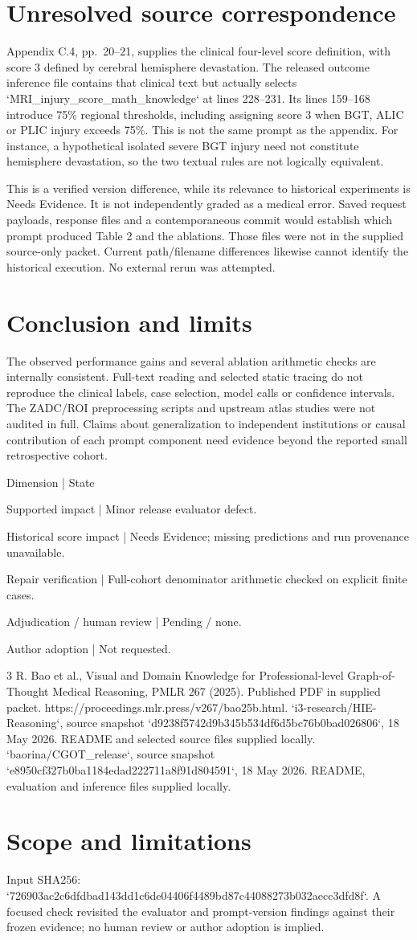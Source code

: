 \documentclass[10pt]{article}
\begin{document}
\section*{Unresolved source correspondence}
Appendix C.4, pp. 20–21, supplies the clinical four-level score definition, with score 3 defined by cerebral hemisphere devastation. The released outcome inference file contains that clinical text but actually selects `MRI\_injury\_score\_math\_knowledge` at lines 228–231. Its lines 159–168 introduce 75\% regional thresholds, including assigning score 3 when BGT, ALIC or PLIC injury exceeds 75\%. This is not the same prompt as the appendix. For instance, a hypothetical isolated severe BGT injury need not constitute hemisphere devastation, so the two textual rules are not logically equivalent.\par
This is a verified version difference, while its relevance to historical experiments is Needs Evidence. It is not independently graded as a medical error. Saved request payloads, response files and a contemporaneous commit would establish which prompt produced Table 2 and the ablations. Those files were not in the supplied source-only packet. Current path/filename differences likewise cannot identify the historical execution. No external rerun was attempted.\par
\section*{Conclusion and limits}
The observed performance gains and several ablation arithmetic checks are internally consistent. Full-text reading and selected static tracing do not reproduce the clinical labels, case selection, model calls or confidence intervals. The ZADC/ROI preprocessing scripts and upstream atlas studies were not audited in full. Claims about generalization to independent institutions or causal contribution of each prompt component need evidence beyond the reported small retrospective cohort.\par
Dimension | State\par
Supported impact | Minor release evaluator defect.\par
Historical score impact | Needs Evidence; missing predictions and run provenance unavailable.\par
Repair verification | Full-cohort denominator arithmetic checked on explicit finite cases.\par
Adjudication / human review | Pending / none.\par
Author adoption | Not requested.\par
3 R. Bao et al., Visual and Domain Knowledge for Professional-level Graph-of-Thought Medical Reasoning, PMLR 267 (2025). Published PDF in supplied packet. https://proceedings.mlr.press/v267/bao25b.html. `i3-research/HIE-Reasoning`, source snapshot `d9238f5742d9b345b534df6d5bc76b0bad026806`, 18 May 2026. README and selected source files supplied locally. `baorina/CGOT\_release`, source snapshot `e8950cf327b0ba1184edad222711a8f91d804591`, 18 May 2026. README, evaluation and inference files supplied locally.\par
\section*{Scope and limitations}
Input SHA256: `726903ac2c6dfdbad143dd1c6de04406f4489bd87c44088273b032aecc3dfd8f`. A focused check revisited the evaluator and prompt-version findings against their frozen evidence; no human review or author adoption is implied.\par
\end{document}
